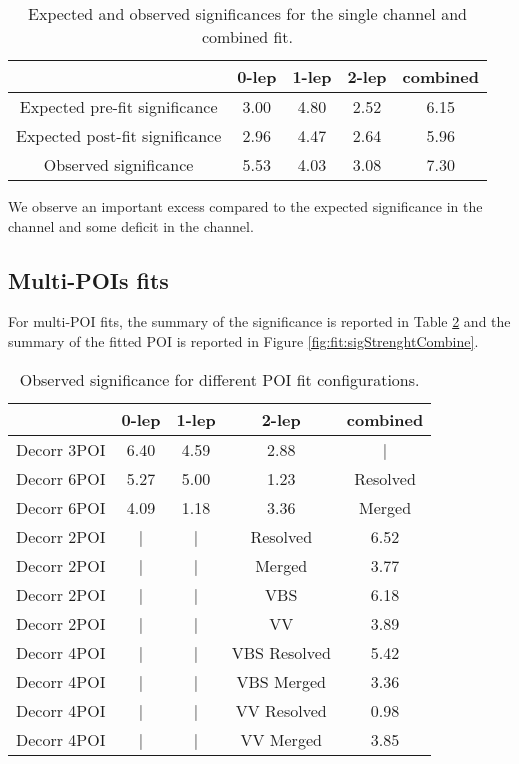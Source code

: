 \begin{table}[h]
  \centering
  \begin{tabular}{|c|c|c|c|c|}
    \hline
           & 0-lep & 1-lep & 2-lep & combined \\
    \hline
    Expected pre-fit significance & 3.00 & 4.80 & 2.52 & 6.15 \\
    \hline
    Expected post-fit significance & 2.96 & 4.47 & 2.64 & 5.96 \\
    \hline
    Observed significance & 5.53 & 4.03 & 3.08 & 7.30 \\
    \hline
  \end{tabular}
  \caption{Expected and observed significances for the single channel and combined fit.}
  \label{tab:significance}
\end{table}

We observe an important excess compared to the expected significance in the \zlep channel and some deficit in the \olep channel.

\subsection{Multi-POIs fits}

For multi-POI fits, the summary of the significance is reported in Table \ref{tab:significance2} and the summary of the fitted POI is reported in Figure \ref{fig:fit:sigStrenghtCombine}.

\begin{table}[h]
  \centering
  \begin{tabular}{|c|c|c|c|c|}
    \hline
     & 0-lep & 1-lep & 2-lep & combined \\
    \hline
    Decorr 3POI & 6.40 & 4.59 & 2.88 & | \\
    \hline
    Decorr 6POI & 5.27 & 5.00 & 1.23 & Resolved \\
    Decorr 6POI & 4.09 & 1.18 & 3.36 & Merged \\
    \hline
    Decorr 2POI & | & | & Resolved & 6.52 \\
    Decorr 2POI & | & | & Merged   & 3.77 \\
    \hline
    Decorr 2POI & | & | & VBS & 6.18 \\
    Decorr 2POI & | & | & VV  & 3.89 \\
    \hline
    Decorr 4POI & | & | & VBS Resolved & 5.42 \\
    Decorr 4POI & | & | & VBS Merged & 3.36 \\
    Decorr 4POI & | & | & VV Resolved & 0.98 \\
    Decorr 4POI & | & | & VV Merged & 3.85 \\
    \hline
  \end{tabular}
  \caption{Observed significance for different POI fit configurations.}
  \label{tab:significance2}
\end{table}

